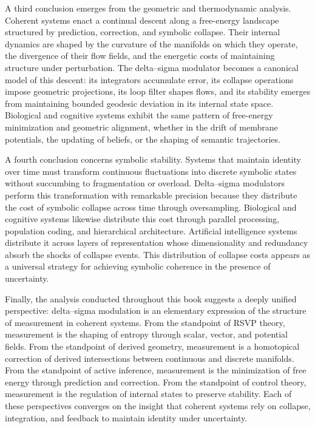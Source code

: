 A third conclusion emerges from the geometric and thermodynamic analysis. Coherent systems enact a continual descent along a free-energy landscape structured by prediction, correction, and symbolic collapse. Their internal dynamics are shaped by the curvature of the manifolds on which they operate, the divergence of their flow fields, and the energetic costs of maintaining structure under perturbation. The delta–sigma modulator becomes a canonical model of this descent: its integrators accumulate error, its collapse operations impose geometric projections, its loop filter shapes flows, and its stability emerges from maintaining bounded geodesic deviation in its internal state space. Biological and cognitive systems exhibit the same pattern of free-energy minimization and geometric alignment, whether in the drift of membrane potentials, the updating of beliefs, or the shaping of semantic trajectories.

A fourth conclusion concerns symbolic stability. Systems that maintain identity over time must transform continuous fluctuations into discrete symbolic states without succumbing to fragmentation or overload. Delta–sigma modulators perform this transformation with remarkable precision because they distribute the cost of symbolic collapse across time through oversampling. Biological and cognitive systems likewise distribute this cost through parallel processing, population coding, and hierarchical architecture. Artificial intelligence systems distribute it across layers of representation whose dimensionality and redundancy absorb the shocks of collapse events. This distribution of collapse costs appears as a universal strategy for achieving symbolic coherence in the presence of uncertainty.

Finally, the analysis conducted throughout this book suggests a deeply unified perspective: delta–sigma modulation is an elementary expression of the structure of measurement in coherent systems. From the standpoint of RSVP theory, measurement is the shaping of entropy through scalar, vector, and potential fields. From the standpoint of derived geometry, measurement is a homotopical correction of derived intersections between continuous and discrete manifolds. From the standpoint of active inference, measurement is the minimization of free energy through prediction and correction. From the standpoint of control theory, measurement is the regulation of internal states to preserve stability. Each of these perspectives converges on the insight that coherent systems rely on collapse, integration, and feedback to maintain identity under uncertainty.

